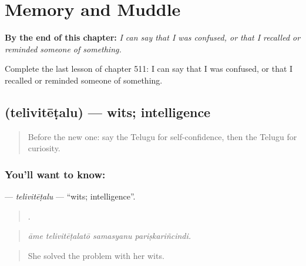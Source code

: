 
\chapter{Memory and Muddle}
\label{ch:te-memory-and-muddle}

\begin{chapteropening}
\textbf{By the end of this chapter:} \emph{I can say that I was confused, or that I recalled or reminded someone of something.}

Complete the last lesson of chapter 511: I can say that I was confused, or that I recalled or reminded someone of something.
\end{chapteropening}

\section[\texorpdfstring{\te{తెలివితేటలు} (telivitēṭalu)}{తెలివితేటలు (telivitēṭalu)}]{ (telivitēṭalu) — wits; intelligence}

\label{lesson:TE-C511-telivitetalu}



\begin{quote}
Before the new one: say the Telugu for self-confidence, then the Telugu for curiosity.
\end{quote}

\subsection*{You'll want to know: }
\textbf{} — \emph{telivitēṭalu} — \textquotedblleft{}wits; intelligence\textquotedblright{}.

\begin{quote}
   .
\end{quote}

\begin{quote}
\emph{āme telivitēṭalatō samasyanu pariṣkariñcindi.}
\end{quote}

\begin{quote}
She solved the problem with her wits.
\end{quote}


